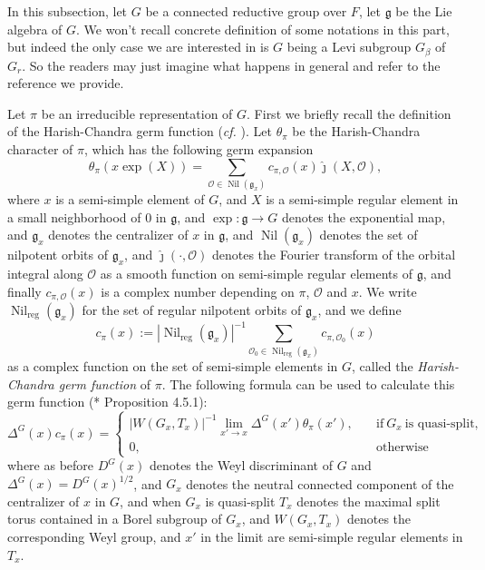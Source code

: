 \documentclass{amsart}
\numberwithin{equation}{section}
\newcommand{\car}[1]{\left|#1\right|}
\newcommand{\mrreg}{\operatorname{reg}}
\newcommand{\mrexp}{\operatorname{exp}}
\newcommand{\mrnil}{\operatorname{Nil}}
\newcommand{\mfg}{\mathfrak{g}}
\newcommand{\mco}{\mathcal{O}}
\begin{document}
	In this subsection, let $G$ be a connected reductive group over $F$, let $\mfg$ be the Lie algebra of $G$. We won't recall concrete definition of some notations in this part, but indeed the only case we are interested in is $G$ being a Levi subgroup $G_{\beta}$ of $G_{r}$. So the readers may just imagine what happens in general and refer to the reference we provide.
	
	Let $\pi$ be an irreducible representation of $G$. First we briefly recall the definition of the Harish-Chandra germ function (\emph{cf.} \cite{harishchandra1999admissible}). Let $\theta_{\pi}$ be the Harish-Chandra character of $\pi$, which has the following germ expansion
	$$\theta_{\pi}(x\mrexp(X))=\sum_{\mco\in\mrnil(\mfg_{x})}c_{\pi,\mco}(x)\hat{\jmath}(X,\mco),$$
	where $x$ is a semi-simple element of $G$, and $X$ is a semi-simple regular element in a small neighborhood of $0$ in $\mfg$, and $\mrexp:\mfg\rightarrow G$ denotes the exponential map, and $\mfg_{x}$ denotes the centralizer of $x$ in $\mfg$, and $\mrnil(\mfg_{x})$ denotes the set of nilpotent orbits of $\mfg_{x}$, and $\hat{\jmath}(\cdot,\mco)$ denotes the Fourier transform of the orbital integral along $\mco$ as a smooth function on semi-simple regular elements of $\mfg$, and finally $c_{\pi,\mco}(x)$ is a complex number depending on $\pi$, $\mco$ and $x$. We write $\mrnil_{\mrreg}(\mfg_{x})$ for the set of regular nilpotent orbits of $\mfg_{x}$, %
	and we define $$c_{\pi}(x):=\car{\mrnil_{\mrreg}(\mfg_{x})}^{-1}\sum_{\mco_{0}\in\mrnil_{\mrreg}(\mfg_{x})}c_{\pi,\mco_{0}}(x)$$ as a complex function on the set of semi-simple elements in $G$, called the \emph{Harish-Chandra germ function} of $\pi$. The following formula can be used to calculate this germ function (\cite{beuzart2020local}*{ Proposition 4.5.1}):
	\begin{equation}\label{eqcpilimtheta}
		\Delta^{G}(x)c_{\pi}(x)=
		\begin{cases}
			\car{W(G_{x},T_{x})}^{-1}\lim_{x'\rightarrow x}\Delta^{G}(x')\theta_{\pi}(x'),\quad&\text{if}\ G_{x}\ \text{is quasi-split},\\
			0, \quad&\text{otherwise}
		\end{cases}
	\end{equation}
	where as before $D^{G}(x)$ denotes the Weyl discriminant of $G$ and $\Delta^{G}(x)=D^{G}(x)^{1/2}$, and $G_{x}$ denotes the neutral connected component of the centralizer of $x$ in $G$, and when $G_{x}$ is quasi-split $T_{x}$ denotes the maximal split torus contained in a Borel subgroup of $G_{x}$, and $W(G_{x},T_{x})$ denotes the corresponding Weyl group, and $x'$ in the limit are semi-simple regular elements in $T_{x}$. 
	
\end{document}
